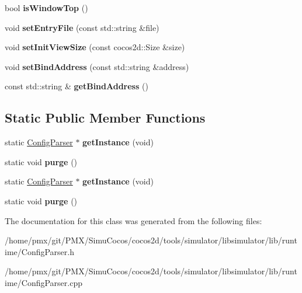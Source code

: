 \begin{DoxyCompactItemize}
bool {\bfseries is\+Window\+Top} ()
\item 
\mbox{\label{classConfigParser_a04dfb1d0e3b9c3aae4990f79521ba9d9}} 
void {\bfseries set\+Entry\+File} (const std\+::string \&file)
\item 
\mbox{\label{classConfigParser_af9d61c348ebb800c9b53249ebb36476e}} 
void {\bfseries set\+Init\+View\+Size} (const cocos2d\+::\+Size \&size)
\item 
\mbox{\label{classConfigParser_a5eeb400d4b72e1c0c61ed7c55b93180e}} 
void {\bfseries set\+Bind\+Address} (const std\+::string \&address)
\item 
\mbox{\label{classConfigParser_ae6b51b403d3fd1ad82855b9ca696fbdb}} 
const std\+::string \& {\bfseries get\+Bind\+Address} ()
\end{DoxyCompactItemize}
\subsection*{Static Public Member Functions}
\begin{DoxyCompactItemize}
\item 
\mbox{\label{classConfigParser_ad75f5d0cfced92ddf0aac0faf911d5c9}} 
static \hyperlink{classConfigParser}{Config\+Parser} $\ast$ {\bfseries get\+Instance} (void)
\item 
\mbox{\label{classConfigParser_a734156ba6518195458ac9006faf5f18f}} 
static void {\bfseries purge} ()
\item 
\mbox{\label{classConfigParser_a894e7b98de122e1eb104661981d302fa}} 
static \hyperlink{classConfigParser}{Config\+Parser} $\ast$ {\bfseries get\+Instance} (void)
\item 
\mbox{\label{classConfigParser_a12510edbc298092346c66adee523ca6d}} 
static void {\bfseries purge} ()
\end{DoxyCompactItemize}


The documentation for this class was generated from the following files\+:\begin{DoxyCompactItemize}
\item 
/home/pmx/git/\+P\+M\+X/\+Simu\+Cocos/cocos2d/tools/simulator/libsimulator/lib/runtime/Config\+Parser.\+h\item 
/home/pmx/git/\+P\+M\+X/\+Simu\+Cocos/cocos2d/tools/simulator/libsimulator/lib/runtime/Config\+Parser.\+cpp\end{DoxyCompactItemize}

